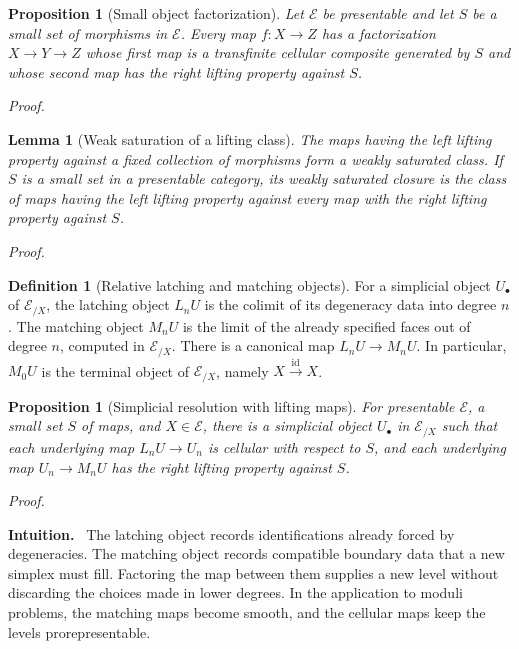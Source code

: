\documentclass[12pt,letterpaper,oneside]{report}
\newtheorem{proposition}[theorem]{Proposition}
\newtheorem{lemma}[theorem]{Lemma}
\theoremstyle{definition}
\newtheorem{definition}[theorem]{Definition}
\theoremstyle{remark}
\renewenvironment{proof}[1][Proof]{\par\nopagebreak[4]\addvspace{4pt}\noindent\textit{#1.}\par\nobreak\vspace{0.5\baselineskip}}{\par\addvspace{4pt}}
\newenvironment{intuition}{\par\noindent\textbf{Intuition.}\ }{\par}
\newcommand{\cE}{\mathcal E}
\newcommand{\id}{\mathrm{id}}
\begin{document}
\begin{proposition}[Small object factorization]
\label{prop:small-object}
Let $\cE$ be presentable and let $S$ be a small set of morphisms in $\cE$. Every map $f:X\to Z$ has a factorization $X\to Y\to Z$ whose first map is a transfinite cellular composite generated by $S$ and whose second map has the right lifting property against $S$.
\end{proposition}
\begin{proof}
\end{proof}


\begin{lemma}[Weak saturation of a lifting class]
The maps having the left lifting property against a fixed collection of morphisms form a weakly saturated class. If $S$ is a small set in a presentable category, its weakly saturated closure is the class of maps having the left lifting property against every map with the right lifting property against $S$.
\end{lemma}
\begin{proof}
\end{proof}


\begin{definition}[Relative latching and matching objects]
For a simplicial object $U_\bullet$ of $\cE_{/X}$, the latching object $L_nU$ is the colimit of its degeneracy data into degree $n$. The matching object $M_nU$ is the limit of the already specified faces out of degree $n$, computed in $\cE_{/X}$. There is a canonical map $L_nU\to M_nU$. In particular, $M_0U$ is the terminal object of $\cE_{/X}$, namely $X\xrightarrow{\id}X$.
\end{definition}

\begin{proposition}[Simplicial resolution with lifting maps]
\label{prop:simplicial-resolution}
For presentable $\cE$, a small set $S$ of maps, and $X\in\cE$, there is a simplicial object $U_\bullet$ in $\cE_{/X}$ such that each underlying map $L_nU\to U_n$ is cellular with respect to $S$, and each underlying map $U_n\to M_nU$ has the right lifting property against $S$.
\end{proposition}
\begin{proof}
\end{proof}


\begin{intuition}
The latching object records identifications already forced by degeneracies. The matching object records compatible boundary data that a new simplex must fill. Factoring the map between them supplies a new level without discarding the choices made in lower degrees. In the application to moduli problems, the matching maps become smooth, and the cellular maps keep the levels prorepresentable.
\end{intuition}
\end{document}
